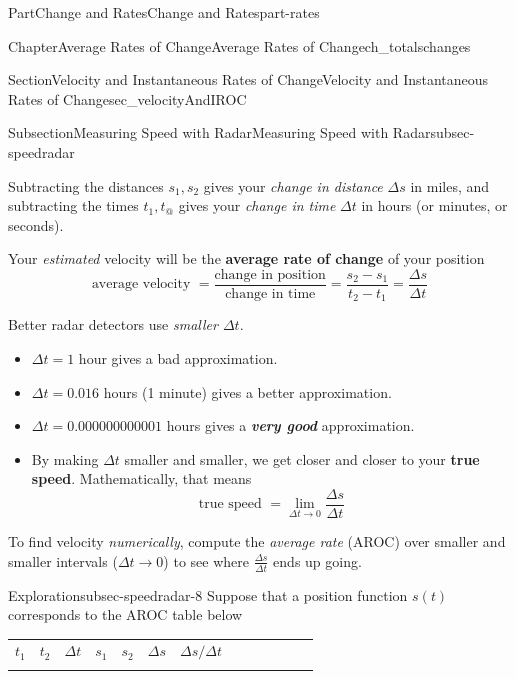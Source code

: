 \documentclass[oneside,10pt,]{tufte-book}
\newcommand{\tabularfont}{\relax}
\newcommand{\alert}[1]{\textbf{\textit{#1}}}
\newcommand{\terminology}[1]{\textbf{#1}}
\numberwithin{equation}{chapter}
\newcommand{\hrulemedium}{\noalign{\hrule height 0.07em}}
\begin{document}
\begin{partptx}{Part}{Change and Rates}{}{Change and Rates}{}{}{part-rates}
\begin{chapterptx}{Chapter}{Average Rates of Change}{}{Average Rates of Change}{}{}{ch_totalschanges}
\begin{sectionptx}{Section}{Velocity and Instantaneous Rates of Change}{}{Velocity and Instantaneous Rates of Change}{}{}{sec_velocityAndIROC}
\begin{subsectionptx}{Subsection}{Measuring Speed with Radar}{}{Measuring Speed with Radar}{}{}{subsec-speedradar}
\begin{image}{0}{1}{0}{}
{
}%
\end{image}%
Subtracting the distances \(s_1,s_2\) gives your \emph{change in distance} \(\Delta s\) in miles, and subtracting the times \(t_1,t_@\) gives your \emph{change in time} \(\Delta t\) in hours (or minutes, or seconds).%
\par
Your \emph{estimated} velocity will be the \terminology{average rate of change} of your position%
\begin{equation*}
\text{average velocity } = \dfrac{\text{change in position}}{\text{change in time}} = \dfrac{s_2-s_1}{t_2-t_1} = \dfrac{\Delta s}{\Delta t}
\end{equation*}
%
\par
Better radar detectors use \emph{smaller \(\Delta t\)}.%
\begin{itemize}[label=\textbullet]
\item{}\(\Delta t = 1\) hour gives a bad approximation.%
\item{}\(\Delta t = 0.016\) hours (1 minute) gives a better approximation.%
\item{}\(\Delta t = 0.000000000001\) hours gives a \alert{very good} approximation.%
\item{}By making \(\Delta t\) smaller and smaller, we get closer and closer to your \terminology{true speed}.  Mathematically, that means%
\begin{equation*}
\text{true speed } = \lim_{\Delta t\rightarrow 0} \dfrac{\Delta s}{\Delta t} 
\end{equation*}
%
\end{itemize}
%
\par
To find velocity \emph{numerically}, compute the \emph{average rate} (AROC) over smaller and smaller intervals (\(\Delta t\rightarrow 0\)) to see where \(\frac{\Delta s}{\Delta t}\) ends up going.%
\begin{exploration}{Exploration}{}{subsec-speedradar-8}%
Suppose that a position function \(s(t)\) corresponds to the AROC table below \begin{center}%
{\tabularfont%
\begin{tabular}{lBlBlBlBlBlBl}
\(t_1\)&\(t_2\)&\(\Delta t\)&\(s_1\)&\(s_2\)&\(\Delta s\)&\(\Delta s/\Delta t\)\tabularnewline\hrulemedium

\end{tabular}}
\end{center}
\end{exploration}
\end{subsectionptx}
\end{sectionptx}
\end{chapterptx}
\end{partptx}
\end{document}
